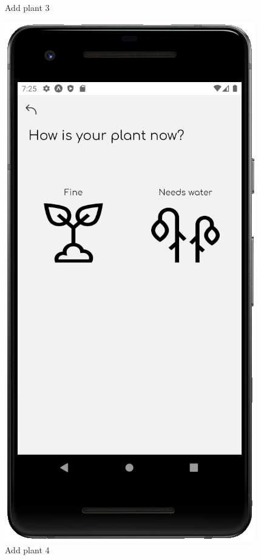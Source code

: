 \documentclass[10pt]{article}
\begin{document}
\begin{figure}[h]
\begin{minipage}[h]{0.4\textwidth}
         \caption{Add plant 3}
     \end{minipage}%
     \hfill
     \begin{minipage}[h]{0.4\textwidth}
         \centering
         \includegraphics[width=\textwidth]{resources/screens/AddPlant4.PNG}
         \caption{Add plant 4}
     \end{minipage}
    \end{figure}
    
\end{document}
